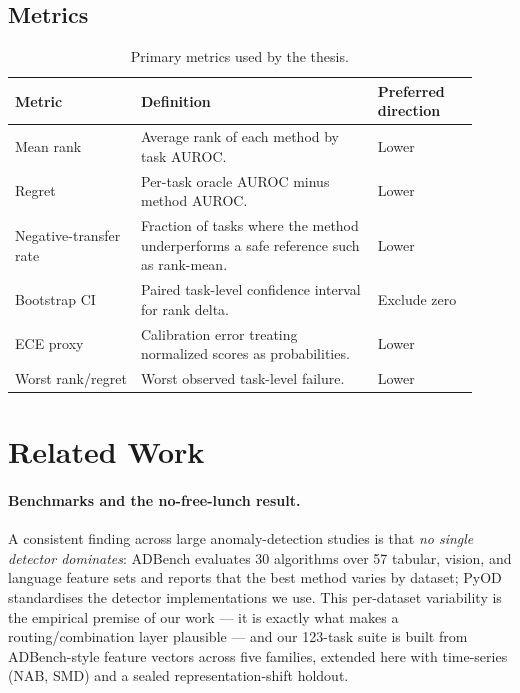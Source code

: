 \documentclass[11pt,titlepage]{article}
\begin{document}
\subsection{Metrics}

\begin{table}[H]
\centering
\caption{Primary metrics used by the thesis.}
\label{tab:metrics}
\small
\begin{tabular}{L{0.25\linewidth}L{0.47\linewidth}L{0.20\linewidth}}
\toprule
\textbf{Metric} & \textbf{Definition} & \textbf{Preferred direction} \\
\midrule
Mean rank & Average rank of each method by task AUROC. & Lower \\
Regret & Per-task oracle AUROC minus method AUROC. & Lower \\
Negative-transfer rate & Fraction of tasks where the method underperforms a safe reference such as rank-mean. & Lower \\
Bootstrap CI & Paired task-level confidence interval for rank delta. & Exclude zero \\
ECE proxy & Calibration error treating normalized scores as probabilities. & Lower \\
Worst rank/regret & Worst observed task-level failure. & Lower \\
\bottomrule
\end{tabular}
\end{table}

\section{Related Work}
\label{sec:related}

\paragraph{Benchmarks and the no-free-lunch result.} A consistent finding across
large anomaly-detection studies is that \emph{no single detector dominates}: ADBench
\cite{adbench_th} evaluates 30 algorithms over 57 tabular, vision, and language
feature sets and reports that the best method varies by dataset; PyOD~\cite{pyod_th}
standardises the detector implementations we use. This per-dataset variability is the
empirical premise of our work --- it is exactly what makes a routing/combination
layer plausible --- and our 123-task suite is built from ADBench-style feature
vectors across five families, extended here with time-series (NAB, SMD) and a sealed
representation-shift holdout.
\end{document}
